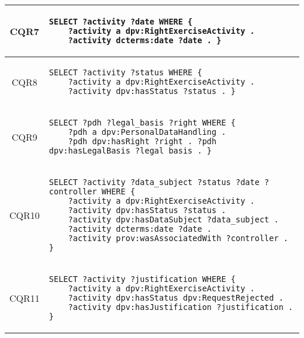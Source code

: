 \begin{table}[htp]
\begin{tabular}{c|l}
        \hline
        CQR7 & \begin{lstlisting}[numbers=none]
SELECT ?activity ?date WHERE {
    ?activity a dpv:RightExerciseActivity . 
    ?activity dcterms:date ?date . } \end{lstlisting} \\
        \hline
        CQR8 & \begin{lstlisting}[numbers=none]
SELECT ?activity ?status WHERE {
    ?activity a dpv:RightExerciseActivity . 
    ?activity dpv:hasStatus ?status . } \end{lstlisting} \\
        \hline
        CQR9 & \begin{lstlisting}[numbers=none]
SELECT ?pdh ?legal_basis ?right WHERE {
    ?pdh a dpv:PersonalDataHandling . 
    ?pdh dpv:hasRight ?right . ?pdh dpv:hasLegalBasis ?legal_basis . } \end{lstlisting} \\
        \hline
        CQR10 & \begin{lstlisting}[numbers=none]
SELECT ?activity ?data_subject ?status ?date ?controller WHERE {
    ?activity a dpv:RightExerciseActivity . 
    ?activity dpv:hasStatus ?status . 
    ?activity dpv:hasDataSubject ?data_subject . 
    ?activity dcterms:date ?date . 
    ?activity prov:wasAssociatedWith ?controller . } \end{lstlisting} \\
        \hline
        CQR11 & \begin{lstlisting}[numbers=none]
SELECT ?activity ?justification WHERE {
    ?activity a dpv:RightExerciseActivity . 
    ?activity dpv:hasStatus dpv:RequestRejected . 
    ?activity dpv:hasJustification ?justification . } \end{lstlisting} \\
    \end{tabular}
\end{table}